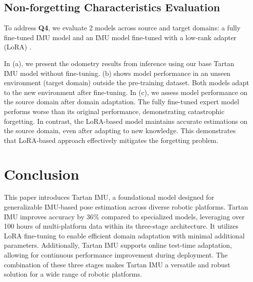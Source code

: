\subsection{Non-forgetting Characteristics Evaluation}
To address \textbf{Q4}, we evaluate 2 models across source and target domains: a fully fine-tuned IMU model and an IMU model fine-tuned with a low-rank adapter (LoRA) \cite{hu2021lora}.

In (a), we present the odometry results from inference using our base Tartan IMU model without fine-tuning.
(b) shows model performance in an unseen environment (target domain) outside the pre-training dataset. Both models adapt to the new environment after fine-tuning. In (c), we assess model performance on the source domain after domain adaptation. The fully fine-tuned expert model performs worse than its original performance, demonstrating catastrophic forgetting. In contrast, the LoRA-based model maintains accurate estimations on the source domain, even after adapting to new knowledge. This demonstrates that LoRA-based approach effectively mitigates the forgetting problem.




\section{Conclusion}
This paper introduces Tartan IMU, a foundational model designed for generalizable IMU-based pose estimation across diverse robotic platforms. Tartan IMU improves accuracy by 36\% compared to specialized models, leveraging over 100 hours of multi-platform data within its three-stage architecture. It utilizes LoRA fine-tuning to enable efficient domain adaptation with minimal additional parameters. Additionally, Tartan IMU supports online test-time adaptation, allowing for continuous performance improvement during deployment. The combination of these three stages makes Tartan IMU a versatile and robust solution for a wide range of robotic platforms.

